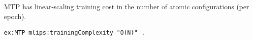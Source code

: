MTP has linear-scaling training cost in the number of atomic
configurations (per epoch).
\begin{lstlisting}[language=turtle]
ex:MTP mlips:trainingComplexity "O(N)" .
\end{lstlisting}
